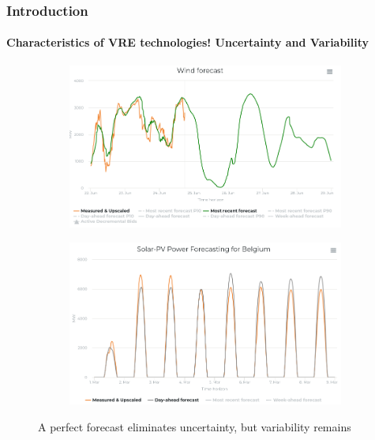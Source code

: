\documentclass[aspectratio=169]{beamer}
\begin{document}
\begin{frame}
  \frametitle{Introduction}
  \framesubtitle{Characteristics of VRE technologies! Uncertainty and Variability}
  \begin{figure}
    \centering
    \begin{subfigure}[b]{0.49\textwidth}
      \includegraphics[width=\textwidth]{wind.png}
      \label{fig:s5s164}
    \end{subfigure}
    \hfill %
    \begin{subfigure}[b]{0.49\textwidth}
      \includegraphics[width=\textwidth]{solar.png}
      \label{fig:s5s165}
    \end{subfigure}
    \caption*{\small A perfect forecast eliminates uncertainty, but variability remains}
  \end{figure}
  
\end{frame}
\end{document}
